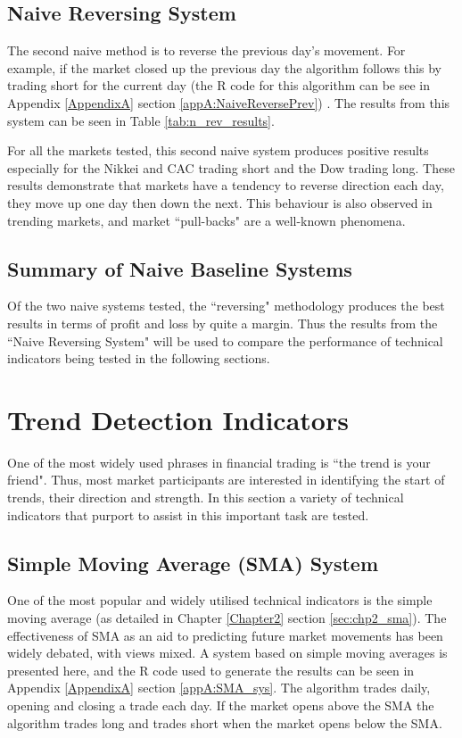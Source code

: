 

\subsection{Naive Reversing System}
\label{sec:naive:rev}
The second naive method is to reverse the previous day's movement. For example, if the market closed up the previous day the algorithm follows this by trading short for the current day (the R code for this algorithm can be see in Appendix \ref{AppendixA} section \ref{appA:NaiveReversePrev}) . The results from this system can be seen in Table \ref{tab:n_rev_results}. 



For all the markets tested, this second naive system produces positive results especially for the Nikkei and CAC trading short and the Dow trading long. These results demonstrate that markets have a tendency to reverse direction each day, they move up one day then down the next. This behaviour is also observed in trending markets, and market \textquotedblleft pull-backs" are a well-known phenomena.

\subsection{Summary of Naive Baseline Systems}
Of the two naive systems tested, the \textquotedblleft reversing" methodology produces the best results in terms of profit and loss by quite a margin. Thus the results from the \textquotedblleft Naive Reversing System" will be used to compare the performance of technical indicators being tested in the following sections.

\section{Trend Detection Indicators}
\label{sec:trend}

One of the most widely used phrases in financial trading is \textquotedblleft the trend is your friend". Thus, most market participants are interested in identifying the start of trends, their direction and strength. In this section a variety of technical indicators that purport to assist in this important task are tested. 

\subsection{Simple Moving Average (SMA) System}
\label{sec:Chp4a:sma}
One of the most popular and widely utilised technical indicators is the simple moving average (as detailed in Chapter \ref{Chapter2} section \ref{sec:chp2_sma}). The effectiveness of SMA as an aid to predicting future market movements has been widely debated, with views mixed. A system based on simple moving averages is presented here, and the R code used to generate the results can be seen in Appendix \ref{AppendixA} section \ref{appA:SMA_sys}. The algorithm trades daily, opening and closing a trade each day.  If the market opens above the SMA the algorithm trades long and trades short when the market opens below the SMA.

